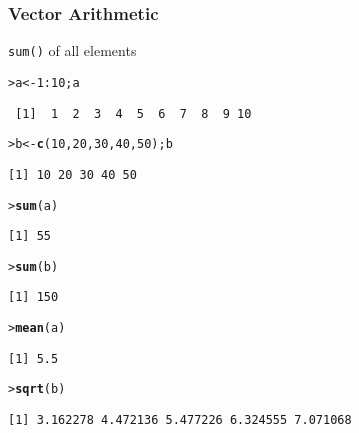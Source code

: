 \documentclass[13pt,aspectratio=169]{beamer}\usepackage[]{graphicx}\usepackage[]{color}
\makeatletter
\newcommand{\hlnum}[1]{\textcolor[rgb]{0.686,0.059,0.569}{#1}}%
\newcommand{\hlopt}[1]{\textcolor[rgb]{0,0,0}{#1}}%
\newcommand{\hlstd}[1]{\textcolor[rgb]{0.345,0.345,0.345}{#1}}%
\newcommand{\hlkwb}[1]{\textcolor[rgb]{0.69,0.353,0.396}{#1}}%
\newcommand{\hlkwd}[1]{\textcolor[rgb]{0.737,0.353,0.396}{\textbf{#1}}}%
\newenvironment{kframe}{%
 \def\at@end@of@kframe{}%
 \ifinner\ifhmode%
  \def\at@end@of@kframe{\end{minipage}}%
  \begin{minipage}{\columnwidth}%
 \fi\fi%
 \def\FrameCommand##1{\hskip\@totalleftmargin \hskip-\fboxsep
 \colorbox{shadecolor}{##1}\hskip-\fboxsep
     \hskip-\linewidth \hskip-\@totalleftmargin \hskip\columnwidth}%
 \MakeFramed {\advance\hsize-\width
   \@totalleftmargin\z@ \linewidth\hsize
   \@setminipage}}%
 {\par\unskip\endMakeFramed%
 \at@end@of@kframe}
\newenvironment{knitrout}{}{} %
\renewcommand{\tt}[1]{\texttt{#1}}
\renewenvironment{knitrout}{\setlength{\topsep}{0mm}}{}
\makeatother
\begin{document}
\begin{frame}[fragile]
    \frametitle{Vector Arithmetic}
\vskip10pt
\tt{sum()} of all elements
\vskip10pt
\begin{knitrout}\small
{}\color{fgcolor}\begin{kframe}
\begin{alltt}
\hlstd{> }\hlstd{a} \hlkwb{<-} \hlnum{1}\hlopt{:}\hlnum{10}\hlstd{; a}
\end{alltt}
\begin{verbatim}
 [1]  1  2  3  4  5  6  7  8  9 10
\end{verbatim}
\begin{alltt}
\hlstd{> }\hlstd{b} \hlkwb{<-} \hlkwd{c}\hlstd{(}\hlnum{10}\hlstd{,} \hlnum{20}\hlstd{,} \hlnum{30}\hlstd{,} \hlnum{40}\hlstd{,} \hlnum{50}\hlstd{); b}
\end{alltt}
\begin{verbatim}
[1] 10 20 30 40 50
\end{verbatim}
\begin{alltt}
\hlstd{> }\hlkwd{sum}\hlstd{(a)}
\end{alltt}
\begin{verbatim}
[1] 55
\end{verbatim}
\begin{alltt}
\hlstd{> }\hlkwd{sum}\hlstd{(b)}
\end{alltt}
\begin{verbatim}
[1] 150
\end{verbatim}
\begin{alltt}
\hlstd{> }\hlkwd{mean}\hlstd{(a)}
\end{alltt}
\begin{verbatim}
[1] 5.5
\end{verbatim}
\begin{alltt}
\hlstd{> }\hlkwd{sqrt}\hlstd{(b)}
\end{alltt}
\begin{verbatim}
[1] 3.162278 4.472136 5.477226 6.324555 7.071068
\end{verbatim}
\end{kframe}
\end{knitrout}
\end{frame}
\end{document}
